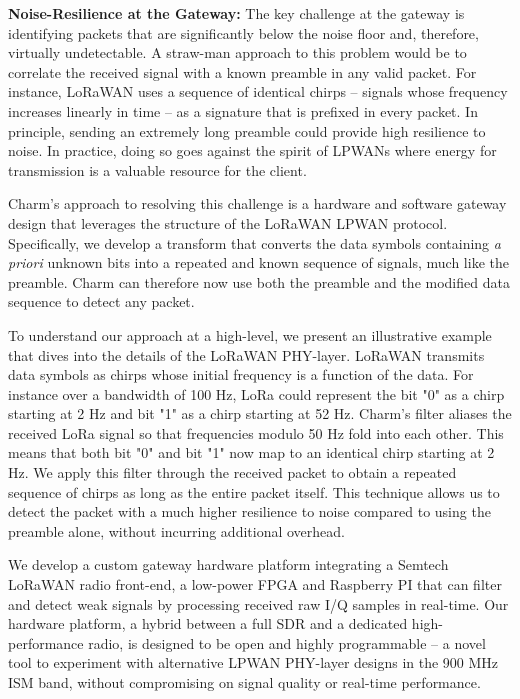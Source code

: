 \noindent \textbf{Noise-Resilience at the Gateway:} The key challenge at the
gateway is identifying packets that are significantly below the noise floor
and, therefore, virtually undetectable. A straw-man approach to this problem
would be to correlate the received signal with a known preamble in any valid
packet. For instance, LoRaWAN uses a sequence of identical chirps -- signals
whose frequency increases linearly in time -- as a signature that is prefixed
in every packet. In principle, sending an extremely long preamble could
provide high resilience to noise. In practice, doing so goes against the
spirit of LPWANs where energy for transmission is a valuable resource for the
client.

Charm's approach to resolving this challenge is a hardware and software gateway
design that leverages the structure of the LoRaWAN LPWAN protocol.
Specifically, we develop a transform that converts the data symbols containing
\textit{a priori} unknown bits into a repeated and known sequence of signals,
much like the preamble. Charm can therefore now use both the preamble and the
modified data sequence to detect any packet.

To understand our approach at a high-level, we present an illustrative example
that dives into the details of the LoRaWAN PHY-layer. LoRaWAN transmits data
symbols as chirps whose initial frequency is a function of the data. For
instance over a bandwidth of 100 Hz, LoRa could represent the bit "0" as a
chirp starting at 2 Hz and bit "1" as a chirp starting at 52 Hz. Charm's
filter aliases the received LoRa signal so that frequencies modulo 50 Hz fold
into each other. This means that both bit "0" and bit "1" now map to an
identical chirp starting at 2 Hz. We apply this filter through the received
packet to obtain a repeated sequence of chirps as long as the entire packet
itself. This technique allows us to detect the packet with a much higher
resilience to noise compared to using the preamble alone, without incurring
additional overhead.

We develop a custom gateway hardware platform integrating a Semtech LoRaWAN
radio front-end, a low-power FPGA and Raspberry PI that can filter and detect
weak signals by processing received raw I/Q samples in real-time. Our hardware
platform, a hybrid between a full SDR and a dedicated high-performance radio,
is designed to be open and highly programmable -- a novel tool to experiment
with alternative LPWAN PHY-layer designs in the 900 MHz ISM band, without
compromising on signal quality or real-time performance.


